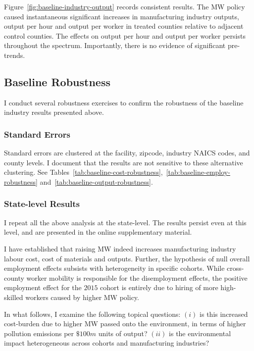 \documentclass[12pt, english]{article}
\begin{document}
    Figure~\ref{fig:baseline-industry-output} records consistent results. The MW policy caused instantaneous significant increases in manufacturing industry outputs, output per hour and output per worker in treated counties relative to adjacent control counties. The effects on output per hour and output per worker persists throughout the spectrum. Importantly, there is no evidence of significant pre-trends.
    

    \subsection{Baseline Robustness}\label{subsec:baseline-robustness}
    I conduct several robustness exercises to confirm the robustness of the baseline industry results presented above.

    \subsubsection{Standard Errors} Standard errors are clustered at the facility, zipcode, industry NAICS codes, and county levels. I document that the results are not sensitive to these alternative clustering. See Tables~\ref{tab:baseline-cost-robustness},~\ref{tab:baseline-employ-robustness} and~\ref{tab:baseline-output-robustness}.
    
    
    

    \subsubsection{State-level Results} I repeat all the above analysis at the state-level. The results persist even at this level, and are presented in the online supplementary material.

    I have established that raising MW indeed increases manufacturing industry labour cost, cost of materials and outputs. Further, the hypothesis of null overall employment effects subsists with heterogeneity in specific cohorts. While cross-county worker mobility is responsible for the disemployment effects, the positive employment effect for the $2015$ cohort is entirely due to hiring of more high-skilled workers caused by higher MW policy.

    In what follows, I examine the following topical questions: $(i)$ is this increased cost-burden due to higher MW passed onto the environment, in terms of higher pollution emissions per $\$100m$ units of output? $(ii)$ is the environmental impact heterogeneous across cohorts and manufacturing industries?
\end{document}
